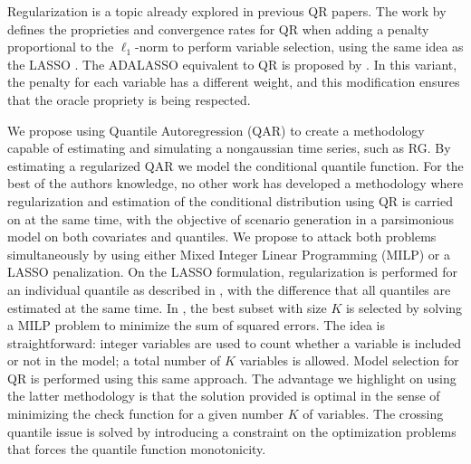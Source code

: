 Regularization is a topic already explored in previous QR papers.
The work by \cite{belloni_l1-penalized_2009} defines the proprieties and convergence rates for QR when adding a penalty proportional to the $\ell_1$-norm to perform variable selection, using the same idea as the LASSO \cite{tibshirani1996regression}. The ADALASSO equivalent to QR is proposed by \cite{ciuperca_adaptive_2016}. In this variant, the penalty for each variable has a different weight, and this modification ensures that the oracle propriety is being respected.

We propose using Quantile Autoregression (QAR) to create a methodology capable of estimating and simulating a nongaussian time series, such as RG. By estimating a regularized QAR we model the conditional quantile function.
For the best of the authors knowledge, no other work has developed a methodology where regularization and estimation of the conditional distribution using QR is carried on at the same time, with the objective of scenario generation in a parsimonious model on both covariates and quantiles. 
We propose to attack both problems simultaneously by using either Mixed Integer Linear Programming (MILP) or a LASSO penalization. On the LASSO formulation, regularization is performed for an individual quantile as described in \cite{belloni_l1-penalized_2009}, with the difference that all quantiles are estimated at the same time.
In \cite{bertsimas_best_2015}, the best subset with size $K$ is selected  by solving a MILP problem to minimize the sum of squared errors.
The idea is straightforward: integer variables are used to count whether a variable is included or not in the model; a total number of $K$ variables is allowed.
Model selection for QR is performed using this same approach. The advantage we highlight on using the latter methodology is that the solution provided is optimal in the sense of minimizing the check function for a given number $K$ of variables. The crossing quantile issue is solved by introducing a constraint on the optimization problems that forces the quantile function monotonicity.




